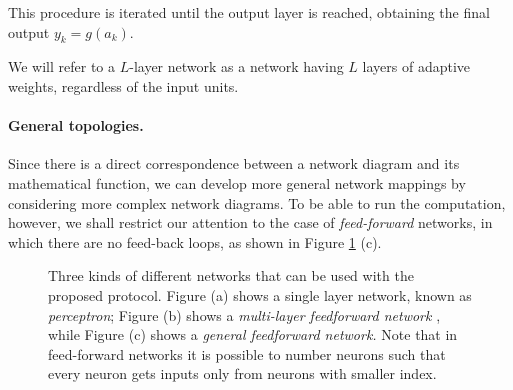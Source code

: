 \documentclass[11pt,oribibl,runningheads]{llncs}
\begin{document}
This procedure is iterated until the output layer is reached,
obtaining the final output $y_k = g(a_k)$.

We will refer to a $L$-layer network as a network having $L$
layers of adaptive weights, regardless of the input units.

\paragraph{General topologies.}
Since there is a direct correspondence between a network diagram
and its mathematical function, we can develop more general network
mappings by considering more complex network diagrams. To be able to run the computation,
however, we shall restrict our attention to the case of {\em feed-forward}
networks, in which there are no feed-back loops, as shown in Figure
\ref{networks} (c).
%
\begin{figure}[t]
\centering
\qquad {}
\qquad {}
\caption{Three kinds of different networks that can be used with
the proposed protocol. Figure (a) shows a single layer network,
known as {\em perceptron}; Figure (b) shows a {\em multi-layer
feedforward network }, while Figure (c) shows a {\em general
feedforward network.} Note that in feed-forward networks it is
possible to number neurons such that every neuron gets inputs only
from neurons with smaller index. }\label{networks}
\end{figure}
%
\end{document}
